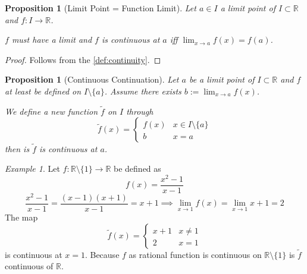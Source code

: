 \documentclass[english,titlepage]{uzhpub}
\theoremstyle{definition}
\theoremstyle{plain}
\newtheorem{proposition}[definition]{Proposition}
\theoremstyle{remark}
\theoremstyle{example}
\newtheorem*{example}{Example}
\begin{document}
   \begin{proposition}[Limit Point = Function Limit]
      Let \(a \in I\) a limit point of \(I \subset \mathbb{R}\) and \(f: I \to \mathbb{R}\).

      \(f\) must have a limit and \(f\) is continuous at \(a\) iff \(\lim_{x \to a} f(x) = f(a)\).
   \end{proposition}
   \begin{proof}
      Follows from the \cref{def:continuity}.
   \end{proof}

   \begin{proposition}[Continuous Continuation]\label{pro:continuous_contin}
      Let \(a\) be a limit point of \(I \subset \mathbb{R}\) and \(f\) at least be defined on \(I \setminus \{a\}\).
      Assume there exists \(b := \lim_{x \to a} f(x)\).

      We define a new function \(\widetilde{f}\) on \(I\) through
      \[\widetilde{f}(x) = \begin{cases} f(x)& x \in I \setminus \{a\}\\b & x = a\end{cases}\]
      then is \(\widetilde{f}\) is continuous at \(a\).
   \end{proposition}
   \begin{example}
      Let \(f: \mathbb{R} \setminus \{1\} \to \mathbb{R}\) be defined as
      \[f(x) = \frac{x^2 - 1}{x - 1}\]
      \[\frac{x^2 - 1}{x - 1} = \frac{(x-1)(x+1)}{x-1} = x+1 \implies \lim_{x \to 1} f(x) = \lim_{x \to 1} x + 1 = 2\]
      The map
      \[\widetilde{f}(x) = \begin{cases}x+1& x \neq 1\\ 2 & x = 1\end{cases}\]
      is continuous at \(x = 1\).
      Because \(f\) as rational function is continuous on \(\mathbb{R} \setminus \{1\}\) is \(\widetilde{f}\) continuous of \(\mathbb{R}\).
   \end{example}
\end{document}
